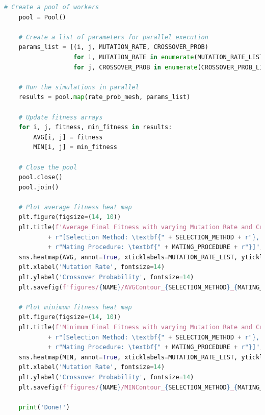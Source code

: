 \documentclass[10pt]{article}
\begin{document}
\begin{lstlisting}[language=Python, caption=CGA\_TuningExperiments.py, label=CGA_TuningExperimentspy]
    # Create a pool of workers
    pool = Pool()
    
    # Create a list of parameters for parallel execution
    params_list = [(i, j, MUTATION_RATE, CROSSOVER_PROB) 
                   for i, MUTATION_RATE in enumerate(MUTATION_RATE_LIST) 
                   for j, CROSSOVER_PROB in enumerate(CROSSOVER_PROB_LIST)]
    
    # Run the simulations in parallel
    results = pool.map(rate_prob_mesh, params_list)
    
    # Update fitness arrays
    for i, j, fitness, min_fitness in results:
        AVG[i, j] = fitness
        MIN[i, j] = min_fitness
    
    # Close the pool
    pool.close()
    pool.join()
    
    # Plot average fitness heat map
    plt.figure(figsize=(14, 10))
    plt.title(f'Average Final Fitness with varying Mutation Rate and Crossover Probability on {NAME} Function \n' 
            + r"[Selection Method: \textbf{" + SELECTION_METHOD + r"}, "
            + r"Mating Procedure: \textbf{" + MATING_PROCEDURE + r"}]", fontsize=18)
    sns.heatmap(AVG, annot=True, xticklabels=MUTATION_RATE_LIST, yticklabels=CROSSOVER_PROB_LIST)
    plt.xlabel('Mutation Rate', fontsize=14)
    plt.ylabel('Crossover Probability', fontsize=14)
    plt.savefig(f'figures/{NAME}/AVGContour_{SELECTION_METHOD}_{MATING_PROCEDURE}.png')
    
    # Plot minimum fitness heat map
    plt.figure(figsize=(14, 10))
    plt.title(f'Minimum Final Fitness with varying Mutation Rate and Crossover Probability on {NAME} Function \n' 
            + r"[Selection Method: \textbf{" + SELECTION_METHOD + r"}, "
            + r"Mating Procedure: \textbf{" + MATING_PROCEDURE + r"}]", fontsize=18)
    sns.heatmap(MIN, annot=True, xticklabels=MUTATION_RATE_LIST, yticklabels=CROSSOVER_PROB_LIST)
    plt.xlabel('Mutation Rate', fontsize=14)
    plt.ylabel('Crossover Probability', fontsize=14)
    plt.savefig(f'figures/{NAME}/MINContour_{SELECTION_METHOD}_{MATING_PROCEDURE}.png')
    
    print('Done!')
\end{lstlisting}
\end{document}
